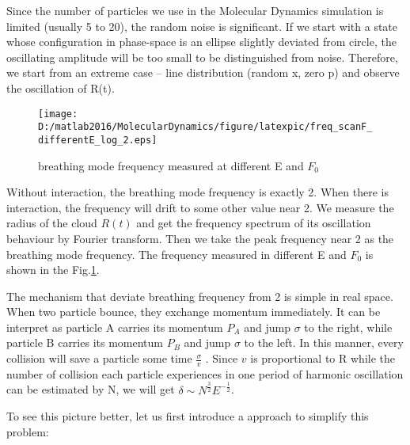 \documentclass[aps,pre,twocolumn
,groupedaddress]{revtex4-1}
\begin{document}
Since the number of particles we use in the Molecular Dynamics simulation is limited (usually 5 to 20), the random noise is significant. If we start with a state whose configuration in phase-space is an ellipse slightly deviated from circle, the oscillating amplitude will be too small to be distinguished from noise. Therefore, we start from an extreme case -- line distribution (random x, zero p) and observe the oscillation of R(t). 
\begin{figure}[hbtp]
\center
\texttt{[image: D:/matlab2016/MolecularDynamics/figure/latexpic/freq\_scanF\_differentE\_log\_2.eps]}
\caption{breathing mode frequency measured at different E and $F_0$}
\label{fig:Breathingfrequency1}
\end{figure}

Without interaction, the breathing mode frequency is exactly 2. When there is interaction, the frequency will drift to some other value near 2. We measure the radius of the cloud $R(t)$ and get the frequency spectrum of its oscillation behaviour by Fourier transform. Then we take the peak frequency near 2 as the breathing mode frequency. The frequency measured in different E and $F_0$ is shown in the Fig.\ref{fig:Breathingfrequency1}.

The mechanism that deviate breathing frequency from 2 is simple in real space. When two particle bounce, they exchange momentum immediately. It can be interpret as particle A carries its momentum $P_A$ and jump $\sigma$ to the right, while particle B carries its momentum $P_B$ and jump $\sigma$ to the left. In this manner, every collision will save a particle some time $\frac{\sigma}{v}$ . Since $v$ is proportional to R while the number of collision each particle experiences in one period of harmonic oscillation can be estimated by N, we will get $\delta\sim N^{\frac{3}{2}}E^{-\frac{1}{2}}$. 

To see this picture better, let us first introduce a approach to simplify this problem:
\end{document}
